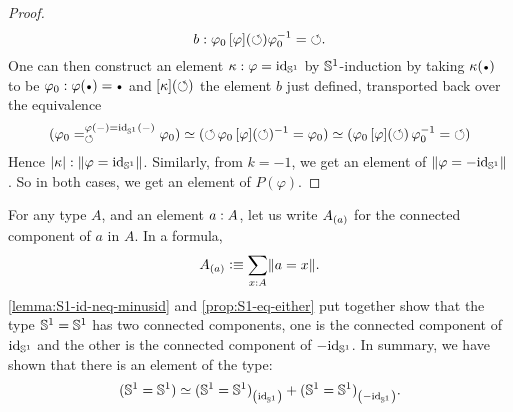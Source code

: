 \documentclass[english,a4paper]{lmcs}
\begin{document}
\begin{proof}
\begin{displaymath}
    b: \varphi_0 \mathop{\left[{\varphi}\right]}(\mathord{\circlearrowleft}) \varphi_0^{-1} = \mathord{\circlearrowleft}.
  \end{displaymath}
  One can then construct an element $\kappa: \varphi = \mathord{\mathrm{id}}_{{\mathbb S^{1}}}$ by
  ${{\mathbb S^{1}}}$-induction by taking $\kappa(\base)$ to be
  $\varphi_0 \from \varphi(\base) = \base$ and $\mathop{\left[{\kappa}\right]}(\mathord{\circlearrowleft})$
  the element $b$ just defined, transported back over the equivalence
  \begin{displaymath}
    (\varphi_0 =^{\varphi(\mathord{{-}}) = \mathord{\mathrm{id}}_{{\mathbb S^{1}}}(\mathord{{-}})}_{\mathord{\circlearrowleft}} \varphi_0) \simeq
    ( {\mathord{\circlearrowleft}}\,\varphi_0 \mathop{\left[{\varphi}\right]}(\mathord{\circlearrowleft})^{-1} = \varphi_0)
    \simeq (\varphi_0 \mathop{\left[{\varphi}\right]}(\mathord{\circlearrowleft})\, \varphi_0^{-1} = \mathord{\circlearrowleft})
  \end{displaymath}
  Hence $\lvert\kappa\rvert : \lVert\varphi = \mathord{\mathrm{id}}_{{\mathbb S^{1}}}\rVert$.
  Similarly, from $k=-1$, we get an
  element of $\lVert\varphi = -\mathord{\mathrm{id}}_{{\mathbb S^{1}}}\rVert$. So in both cases, we get
  an element of $P(\varphi)$.
\end{proof}

For any type $A$, and an element $a: A$, let us write ${A}_{\left(a\right)}$
for the connected component of $a$ in $A$. In a formula,
\begin{displaymath}
  {A}_{\left(a\right)} \vcentcolon\equiv \sum_{x: A}\lVert a=x\rVert.
\end{displaymath}
\cref{lemma:S1-id-neq-minusid} and \cref{prop:S1-eq-either} put
together show that the type ${{\mathbb S^{1}}}={{\mathbb S^{1}}}$ has two connected components,
one is the connected component of $\mathord{\mathrm{id}}_{{\mathbb S^{1}}}$ and the other is the
connected component of $-\mathord{\mathrm{id}}_{{\mathbb S^{1}}}$. In summary, we have shown that
there is an element of the type:
\begin{displaymath}
  ({{\mathbb S^{1}}}={{\mathbb S^{1}}}) \simeq {({{\mathbb S^{1}}}={{\mathbb S^{1}}})}_{\left(\mathord{\mathrm{id}}_{{\mathbb S^{1}}}\right)} + {({{\mathbb S^{1}}}={{\mathbb S^{1}}})}_{\left(-\mathord{\mathrm{id}}_{{\mathbb S^{1}}}\right)}.
\end{displaymath}
\end{document}
